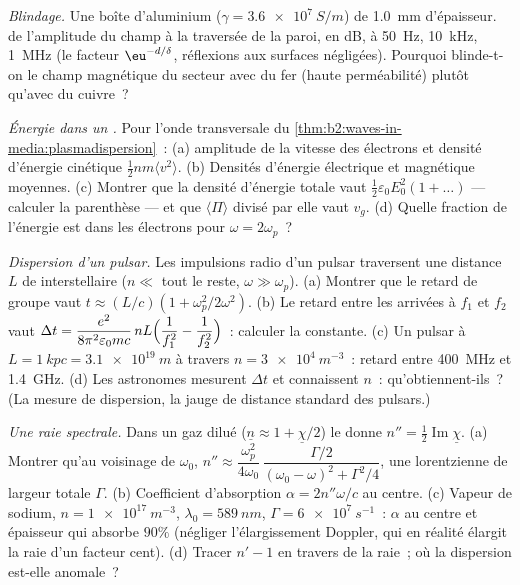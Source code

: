 \begin{exercise}[$\star\star$]\label{exo:b2:waves-in-media:6}
\emph{Blindage.} Une boîte d'aluminium ($\gamma = \qty{3.6e7}{S/m}$) de \qty{1.0}{mm}
d'épaisseur.  de l'amplitude du champ à la traversée de la paroi, en dB, à
\qty{50}{Hz}, \qty{10}{kHz}, \qty{1}{MHz} (le facteur $\eu^{-d/\delta}$, réflexions aux
surfaces négligées). Pourquoi blinde-t-on le champ magnétique du secteur
avec du fer (haute perméabilité) plutôt qu'avec du cuivre~?
\end{exercise}

\begin{exercise}[$\star\star$]\label{exo:b2:waves-in-media:7}
\emph{Énergie dans un .} Pour l'onde transversale du
\cref{thm:b2:waves-in-media:plasmadispersion}~: (a) amplitude de la vitesse des
électrons et densité d'énergie cinétique $\tfrac12nm\langle v^2\rangle$. (b)
Densités d'énergie électrique et magnétique moyennes. (c) Montrer que la densité
d'énergie totale vaut $\tfrac12\varepsilon_0E_0^2(1 + \dots)$ --- calculer la parenthèse ---
et que $\langle\Pi\rangle$ divisé par elle vaut $v_g$. (d) Quelle fraction de
l'énergie est dans les électrons pour $\omega = 2\omega_p$~?
\end{exercise}

\begin{exercise}[$\star\star$]\label{exo:b2:waves-in-media:8}
\emph{Dispersion d'un pulsar.} Les impulsions radio d'un pulsar traversent une distance
$L$ de  interstellaire ($n \ll$ tout le reste, $\omega \gg \omega_p$). (a) Montrer
que le retard de groupe vaut $t \approx (L/c)(1 + \omega_p^2/2\omega^2)$. (b) Le retard
entre les arrivées à $f_1$ et $f_2$ vaut $\Delta t = \dfrac{e^2}{8\pi^2
\varepsilon_0mc}\,nL\Bigl(\dfrac1{f_1^2} - \dfrac1{f_2^2}\Bigr)$~: calculer la constante.
(c) Un pulsar à $L = \qty{1}{kpc} = \qty{3.1e19}{m}$ à travers $n = \qty{3e4}{m^{-3}}$~:
retard entre \qty{400}{MHz} et \qty{1.4}{GHz}. (d) Les astronomes mesurent
$\Delta t$ et connaissent $n$~: qu'obtiennent-ils~? (La mesure de dispersion, la
jauge de distance standard des pulsars.)
\end{exercise}

\begin{exercise}[$\star\star$]\label{exo:b2:waves-in-media:9}
\emph{Une raie spectrale.} Dans un gaz dilué ($\underline n \approx 1 + \underline\chi/2$) le
 donne $n'' = \tfrac12\operatorname{Im}\underline\chi$. (a) Montrer qu'au voisinage de
$\omega_0$, $n'' \approx \dfrac{\omega_p^2}{4\omega_0}\,\dfrac{\Gamma/2}{(\omega_0 - \omega)^2 + \Gamma^2/4}$, une
lorentzienne de largeur totale $\Gamma$. (b) Coefficient d'absorption $\alpha = 2n''\omega/c$
au centre. (c) Vapeur de sodium, $n = \qty{1e17}{m^{-3}}$, $\lambda_0 = \qty{589}{nm}$,
$\Gamma = \qty{6e7}{s^{-1}}$~: $\alpha$ au centre et épaisseur qui absorbe
$90\%$ (négliger l'élargissement Doppler, qui en réalité élargit la raie
d'un facteur cent). (d) Tracer $n' - 1$ en travers de la raie~; où la
dispersion est-elle anomale~?
\end{exercise}

